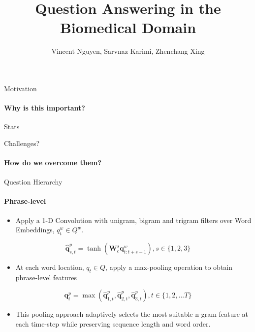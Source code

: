 \documentclass{beamer}
\title{Question Answering in the Biomedical Domain}
\author{Vincent Nguyen, Sarvnaz Karimi, Zhenchang Xing}
\begin{document}
\maketitle

\begin{frame}{Motivation}
\framesubtitle{Why is this important?}
\begin{itemize}
\end{itemize}
\vspace{0.2cm}
\vspace*{3cm}
\end{frame}
\begin{frame}{Stats}
\begin{itemize}
\end{itemize}
\end{frame}

\begin{frame}{Challenges?}
\framesubtitle{How do we overcome them?}
\begin{itemize}
\end{itemize}
\end{frame}

\begin{frame}{}
\framesubtitle{}
 
\end{frame}

\begin{frame}{Question Hierarchy}
  \framesubtitle{Phrase-level}
  
  \begin{itemize}
      \item Apply a 1-D Convolution with unigram, bigram and trigram filters over Word Embeddings, $q^w_t \in Q^w$.
  \end{itemize}
  
  \begin{equation*}
      \mathbf{\hat{q}}^p_{s,t} = \tanh(\mathbf{W}^s_c \mathbf{q}^w_{t:t+s-1}), s \in \{1,2,3\}
  \end{equation*}
  
  \begin{itemize}
      \item At each word location, $q_t \in Q$, apply a max-pooling operation to obtain phrase-level features
  \end{itemize}
  
  \begin{equation*}
      \mathbf{{q}}^p_{t} = \max(\mathbf{\hat{q}}^p_{1, t}, \mathbf{\hat{q}}^p_{2, t},\mathbf{\hat{q}}^p_{3, t}), t \in \{1, 2, ... T\}
  \end{equation*}
  
  \begin{itemize}
      \item This pooling approach adaptively selects the most suitable n-gram feature at each time-step while preserving sequence length and word order.
  \end{itemize}
\end{frame}
\end{document}

